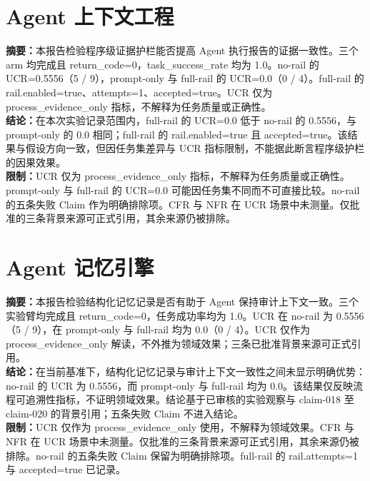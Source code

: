 \documentclass[UTF8]{ctexart}
\begin{document}
\section{Agent 上下文工程}
\textbf{摘要：}本报告检验程序级证据护栏能否提高 Agent 执行报告的证据一致性。三个 arm 均完成且 return\_\allowbreak{}code=0，task\_\allowbreak{}success\_\allowbreak{}rate 均为 1.0。no-\allowbreak{}rail 的 UCR=0.5556（5 / 9），prompt-\allowbreak{}only 与 full-\allowbreak{}rail 的 UCR=0.0（0 / 4）。full-\allowbreak{}rail 的 rail.enabled=true、attempts=1、accepted=true。UCR 仅为 process\_\allowbreak{}evidence\_\allowbreak{}only 指标，不解释为任务质量或正确性。\\
\textbf{结论：}在本次实验记录范围内，full-\allowbreak{}rail 的 UCR=0.0 低于 no-\allowbreak{}rail 的 0.5556，与 prompt-\allowbreak{}only 的 0.0 相同；full-\allowbreak{}rail 的 rail.enabled=true 且 accepted=true。该结果与假设方向一致，但因任务集差异与 UCR 指标限制，不能据此断言程序级护栏的因果效果。\\
\textbf{限制：}UCR 仅为 process\_\allowbreak{}evidence\_\allowbreak{}only 指标，不解释为任务质量或正确性。prompt-\allowbreak{}only 与 full-\allowbreak{}rail 的 UCR=0.0 可能因任务集不同而不可直接比较。no-\allowbreak{}rail 的五条失败 Claim 作为明确排除项。CFR 与 NFR 在 UCR 场景中未测量。仅批准的三条背景来源可正式引用，其余来源仍被排除。
\section{Agent 记忆引擎}
\textbf{摘要：}本报告检验结构化记忆记录是否有助于 Agent 保持审计上下文一致。三个实验臂均完成且 return\_\allowbreak{}code=0，任务成功率均为 1.0。UCR 在 no-\allowbreak{}rail 为 0.5556（5 / 9），在 prompt-\allowbreak{}only 与 full-\allowbreak{}rail 均为 0.0（0 / 4）。UCR 仅作为 process\_\allowbreak{}evidence\_\allowbreak{}only 解读，不外推为领域效果；三条已批准背景来源可正式引用。\\
\textbf{结论：}在当前基准下，结构化记忆记录与审计上下文一致性之间未显示明确优势：no-\allowbreak{}rail 的 UCR 为 0.5556，而 prompt-\allowbreak{}only 与 full-\allowbreak{}rail 均为 0.0。该结果仅反映流程可追溯性指标，不证明领域效果。结论基于已审核的实验观察与 claim-\allowbreak{}018 至 claim-\allowbreak{}020 的背景引用；五条失败 Claim 不进入结论。\\
\textbf{限制：}UCR 仅作为 process\_\allowbreak{}evidence\_\allowbreak{}only 使用，不解释为领域效果。CFR 与 NFR 在 UCR 场景中未测量。仅批准的三条背景来源可正式引用，其余来源仍被排除。no-\allowbreak{}rail 的五条失败 Claim 保留为明确排除项。full-\allowbreak{}rail 的 rail.attempts=1 与 accepted=true 已记录。
\end{document}
